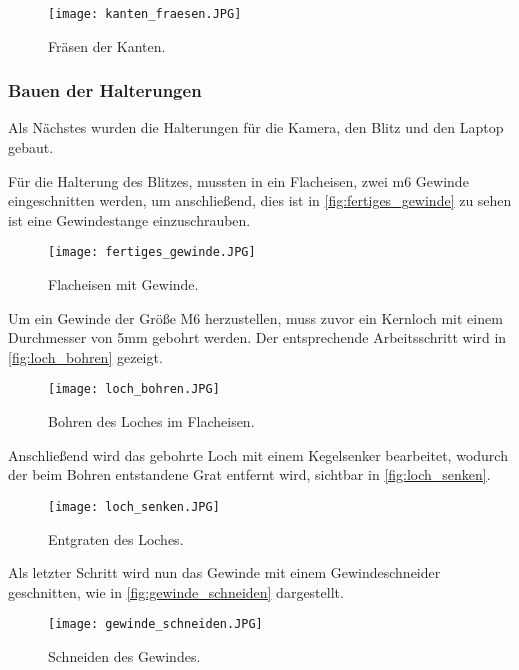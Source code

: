 \begin{figure}[H]
    \centering
    \texttt{[image: kanten\_fraesen.JPG]}
    \caption{Fräsen der Kanten.}
    \label{fig:kanten_fraesen}
\end{figure}

\newpage

\subsubsection{Bauen der Halterungen}

Als Nächstes wurden die Halterungen für die Kamera, den Blitz und den Laptop gebaut.


Für die Halterung des Blitzes, mussten in ein Flacheisen, zwei m6 Gewinde
eingeschnitten werden, um anschließend, dies ist in \autoref{fig:fertiges_gewinde}
zu sehen ist eine Gewindestange einzuschrauben.

\begin{figure}[H]
    \centering
    \texttt{[image: fertiges\_gewinde.JPG]}
    \caption{Flacheisen mit Gewinde.}
    \label{fig:fertiges_gewinde}
\end{figure}

Um ein Gewinde der Größe M6 herzustellen, muss zuvor ein Kernloch mit einem
Durchmesser von 5mm gebohrt werden. Der entsprechende Arbeitsschritt wird in
\autoref{fig:loch_bohren} gezeigt.

\begin{figure}[H]
    \centering
    \texttt{[image: loch\_bohren.JPG]}
    \caption{Bohren des Loches im Flacheisen.}
    \label{fig:loch_bohren}
\end{figure}

\newpage

Anschließend wird das gebohrte Loch mit einem Kegelsenker bearbeitet, wodurch
der beim Bohren entstandene Grat entfernt wird, sichtbar in \autoref{fig:loch_senken}.

\begin{figure}[H]
    \centering
    \texttt{[image: loch\_senken.JPG]}
    \caption{Entgraten des Loches.}
    \label{fig:loch_senken}
\end{figure}

Als letzter Schritt wird nun das Gewinde mit einem Gewindeschneider geschnitten,
wie in \autoref{fig:gewinde_schneiden} dargestellt.

\begin{figure}[H]
    \centering
    \texttt{[image: gewinde\_schneiden.JPG]}
    \caption{Schneiden des Gewindes.}
    \label{fig:gewinde_schneiden}
\end{figure}

